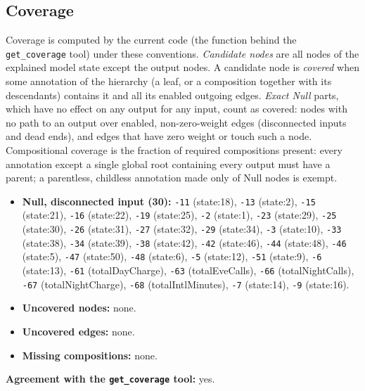 \begin{drafted}
\subsection{Coverage}\label{app:churn100-s2-c2:coverage}
Coverage is computed by the current code (the function behind the \texttt{get\_coverage} tool) under these conventions. \emph{Candidate nodes} are all nodes of the explained model state except the output nodes. A candidate node is \emph{covered} when some annotation of the hierarchy (a leaf, or a composition together with its descendants) contains it and all its enabled outgoing edges. \emph{Exact Null} parts, which have no effect on any output for any input, count as covered: nodes with no path to an output over enabled, non-zero-weight edges (disconnected inputs and dead ends), and edges that have zero weight or touch such a node. Compositional coverage is the fraction of required compositions present: every annotation except a single global root containing every output must have a parent; a parentless, childless annotation made only of Null nodes is exempt.

\begin{itemize}
\item \textbf{Null, disconnected input (30):} \texttt{-11} (state:18), \texttt{-13} (state:2), \texttt{-15} (state:21), \texttt{-16} (state:22), \texttt{-19} (state:25), \texttt{-2} (state:1), \texttt{-23} (state:29), \texttt{-25} (state:30), \texttt{-26} (state:31), \texttt{-27} (state:32), \texttt{-29} (state:34), \texttt{-3} (state:10), \texttt{-33} (state:38), \texttt{-34} (state:39), \texttt{-38} (state:42), \texttt{-42} (state:46), \texttt{-44} (state:48), \texttt{-46} (state:5), \texttt{-47} (state:50), \texttt{-48} (state:6), \texttt{-5} (state:12), \texttt{-51} (state:9), \texttt{-6} (state:13), \texttt{-61} (totalDayCharge), \texttt{-63} (totalEveCalls), \texttt{-66} (totalNightCalls), \texttt{-67} (totalNightCharge), \texttt{-68} (totalIntlMinutes), \texttt{-7} (state:14), \texttt{-9} (state:16).
\item \textbf{Uncovered nodes:} none.
\item \textbf{Uncovered edges:} none.
\item \textbf{Missing compositions:} none.
\end{itemize}
\noindent\textbf{Agreement with the \texttt{get\_coverage} tool:} yes.


\end{drafted}
